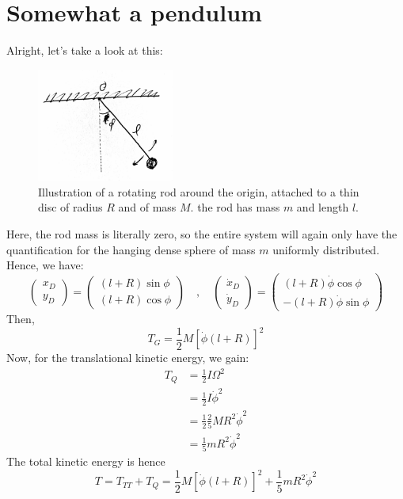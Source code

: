 \section{Somewhat a pendulum}
Alright, let's take a look at this:
\begin{figure}[htb]
    \centering
    \includegraphics[width=0.4\textwidth]{img/c5_pendulum.png}
    \caption{Illustration of a rotating rod around the origin, attached to a thin disc of radius $R$ and of mass $M$. the rod has mass $m$ and length $l$.}
\end{figure}
Here, the rod mass is literally zero, so the entire system will again only have the quantification for the hanging dense sphere of mass $m$ uniformly distributed. Hence, we have:
\begin{equation}
    \begin{pmatrix}
        x_{D} \\
        y_{D}
    \end{pmatrix}
    =
    \begin{pmatrix}
        (l+R)\sin{\phi}\\
        (l+R)\cos{\phi}
    \end{pmatrix}
    \quad , \quad 
    \begin{pmatrix}
        \dot{x}_{D} \\
        \dot{y}_{D}
    \end{pmatrix}
    =
    \begin{pmatrix}
        (l+R)\dot{\phi}\cos{\phi}\\
        -(l+R)\dot{\phi}\sin{\phi}
    \end{pmatrix}
\end{equation}
Then, 
\begin{equation}
    T_{G} = \frac{1}{2}M \left[\dot{\phi}(l+R)\right]^{2}
\end{equation}
Now, for the translational kinetic energy, we gain:
\begin{equation}
    \begin{split}
        T_{Q} 
        & = \frac{1}{2} I \Omega^{2}\\
        & = \frac{1}{2} I \dot{\phi}^{2}\\
        & = \frac{1}{2} \frac{2}{5} MR^{2} \dot{\phi}^{2}\\
        & = \frac{1}{5} mR^{2}\dot{\phi}^{2}
    \end{split}
\end{equation}
The total kinetic energy is hence
\begin{equation}
    T = T_{TT} + T_{Q} = \frac{1}{2}M \left[\dot{\phi}(l+R)\right]^{2} +\frac{1}{5} mR^{2}\dot{\phi}^{2}
\end{equation}


